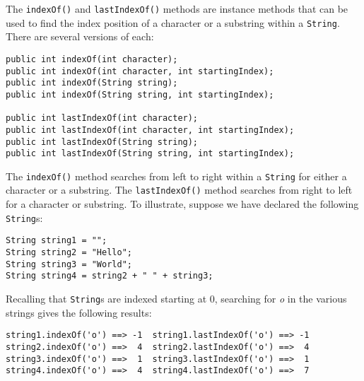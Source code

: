 The {\tt indexOf()} and {\tt lastIndexOf()}
methods are instance methods that can be
used to find the index position of a character or a substring within a
{\tt String}. There are several versions of each:

\begin{jjjlisting}
\begin{lstlisting}
public int indexOf(int character);
public int indexOf(int character, int startingIndex);
public int indexOf(String string);
public int indexOf(String string, int startingIndex);

public int lastIndexOf(int character);
public int lastIndexOf(int character, int startingIndex);
public int lastIndexOf(String string);
public int lastIndexOf(String string, int startingIndex);
\end{lstlisting}
\end{jjjlisting}

\noindent The {\tt indexOf()} method searches from left to right within
a {\tt String} for either a character or a substring.  The
{\tt lastIndexOf()} method searches from right to left for a character or
substring.  To illustrate, suppose we have declared the following
{\tt String}s:

\begin{jjjlisting}
\begin{lstlisting}
String string1 = "";
String string2 = "Hello";
String string3 = "World";
String string4 = string2 + " " + string3;
\end{lstlisting}
\end{jjjlisting}



\noindent Recalling that {\tt String}s are indexed starting at 0,
searching for {\it o} in the various strings gives the following results:

\begin{jjjlisting}[27pc]
\begin{lstlisting}
string1.indexOf('o') ==> -1  string1.lastIndexOf('o') ==> -1
string2.indexOf('o') ==>  4  string2.lastIndexOf('o') ==>  4
string3.indexOf('o') ==>  1  string3.lastIndexOf('o') ==>  1
string4.indexOf('o') ==>  4  string4.lastIndexOf('o') ==>  7
\end{lstlisting}
\end{jjjlisting}


